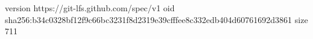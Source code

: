 version https://git-lfs.github.com/spec/v1
oid sha256:b34c0328bf12f9c66bc3231f8d2319e39cfffee8c332edb404d60761692d3861
size 711
